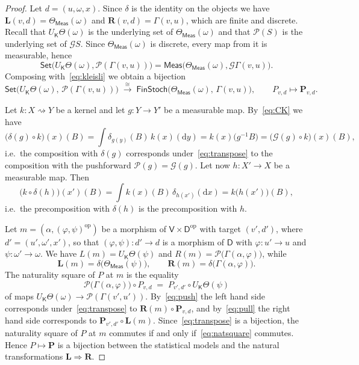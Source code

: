 \documentclass[11pt,a4paper]{article}
\theoremstyle{plain}
\theoremstyle{definition}
\theoremstyle{remark}
\newcommand{\cat}[1]{\mathsf{#1}}
\newcommand{\catV}{\cat{V}}
\newcommand{\catD}{\cat{D}}
\newcommand{\catK}{\cat{K}}
\newcommand{\Meas}{\cat{Meas}}
\newcommand{\Set}{\cat{Set}}
\newcommand{\FinStoch}{\cat{FinStoch}}
\newcommand{\G}{\mathcal{G}}
\newcommand{\Prb}{\mathcal{P}}
\newcommand{\op}{\mathrm{op}}
\newcommand{\del}{\delta}
\begin{document}
\begin{proof}
Let $d = (u,\omega,x)$. Since $\del$ is the identity on the objects we have
$\mathbf{L}(v,d) = \Theta_\Meas(\omega)$ and $\mathbf{R}(v,d) = \Gamma(v,u)$,
which are finite and discrete. Recall that $U_\catK\Theta(\omega)$ is the
underlying set of $\Theta_\Meas(\omega)$ and that $\Prb(S)$ is the underlying
set of $\G S$. Since $\Theta_\Meas(\omega)$ is discrete, every map from it is
measurable, hence
\[
\Set\bigl(U_\catK\Theta(\omega), \Prb(\Gamma(v,u))\bigr)
= \Meas\bigl(\Theta_\Meas(\omega), \G\Gamma(v,u)\bigr).
\]
Composing with~\eqref{eq:kleisli} we obtain a bijection
\begin{equation}\label{eq:transpose}
\Set\bigl(U_\catK\Theta(\omega),\, \Prb(\Gamma(v,u))\bigr)
\;\xrightarrow{\ \cong\ }\;
\FinStoch\bigl(\Theta_\Meas(\omega),\, \Gamma(v,u)\bigr),
\qquad P_{v,d} \longmapsto \mathbf{P}_{v,d}.
\end{equation}

Let $k \colon X \rightsquigarrow Y$ be a kernel and let $g \colon Y \to Y'$ be
a measurable map. By~\eqref{eq:CK} we have
\begin{equation}\label{eq:push}
\bigl(\del(g) \circ k\bigr)(x)(B)
= \int \delta_{g(y)}(B)\, k(x)(\mathrm{d}y)
= k(x)\bigl(g^{-1}B\bigr)
= \bigl(\G(g) \circ k\bigr)(x)(B),
\end{equation}
i.e.\ the composition with $\del(g)$ corresponds under~\eqref{eq:transpose} to
the composition with the pushforward $\Prb(g) = \G(g)$. Let now
$h \colon X' \to X$ be a measurable map. Then
\begin{equation}\label{eq:pull}
\bigl(k \circ \del(h)\bigr)(x')(B)
= \int k(x)(B)\, \delta_{h(x')}(\mathrm{d}x)
= k\bigl(h(x')\bigr)(B),
\end{equation}
i.e.\ the precomposition with $\del(h)$ is the precomposition with $h$.

Let $m = (\alpha, (\varphi,\psi)^{\op})$ be a morphism of
$\catV \times \catD^{\op}$ with target $(v',d')$, where $d' = (u',\omega',x')$,
so that $(\varphi,\psi) \colon d' \to d$ is a morphism of $\catD$ with
$\varphi \colon u' \to u$ and $\psi \colon \omega' \to \omega$. We have
$L(m) = U_\catK\Theta(\psi)$ and
$R(m) = \Prb\bigl(\Gamma(\alpha,\varphi)\bigr)$, while
\[
\mathbf{L}(m) = \del\bigl(\Theta_\Meas(\psi)\bigr),
\qquad
\mathbf{R}(m) = \del\bigl(\Gamma(\alpha,\varphi)\bigr).
\]
The naturality square of $P$ at $m$ is the equality
\[
\Prb\bigl(\Gamma(\alpha,\varphi)\bigr) \circ P_{v,d}
\;=\; P_{v',d'} \circ U_\catK\Theta(\psi)
\]
of maps $U_\catK\Theta(\omega) \to \Prb(\Gamma(v',u'))$. By~\eqref{eq:push}
the left hand side corresponds under~\eqref{eq:transpose} to
$\mathbf{R}(m) \circ \mathbf{P}_{v,d}$, and by~\eqref{eq:pull} the right hand
side corresponds to $\mathbf{P}_{v',d'} \circ \mathbf{L}(m)$.
Since~\eqref{eq:transpose} is a bijection, the naturality square of $P$ at $m$
commutes if and only if~\eqref{eq:natsquare} commutes. Hence
$P \mapsto \mathbf{P}$ is a bijection between the statistical models and the
natural transformations $\mathbf{L} \Rightarrow \mathbf{R}$.


\end{proof}
\end{document}
